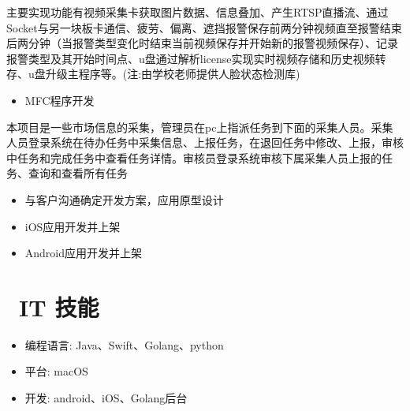\documentclass{resume}
\begin{document}
\begin{onehalfspacing}
主要实现功能有视频采集卡获取图片数据、信息叠加、产生RTSP直播流、通过Socket与另一块板卡通信、疲劳、偏离、遮挡报警保存前两分钟视频直至报警结束后两分钟（当报警类型变化时结束当前视频保存并开始新的报警视频保存）、记录报警类型及其开始时间点、u盘通过解析license实现实时视频存储和历史视频转存、u盘升级主程序等。(注:由学校老师提供人脸状态检测库)
\begin{itemize}
  \item MFC程序开发
\end{itemize}
\end{onehalfspacing}


\begin{onehalfspacing}
本项目是一些市场信息的采集，管理员在pc上指派任务到下面的采集人员。采集人员登录系统在待办任务中采集信息、上报任务，在退回任务中修改、上报，审核中任务和完成任务中查看任务详情。审核员登录系统审核下属采集人员上报的任务、查询和查看所有任务
\begin{itemize}
  \item 与客户沟通确定开发方案，应用原型设计
  \item iOS应用开发并上架
  \item Android应用开发并上架
\end{itemize}
\end{onehalfspacing}


\section{\faCogs\ IT 技能}
\begin{itemize}[parsep=0.5ex]
  \item 编程语言: Java、Swift、Golang、python
  \item 平台: macOS
  \item 开发: android、iOS、Golang后台
\end{itemize}

%
%
\end{document}
